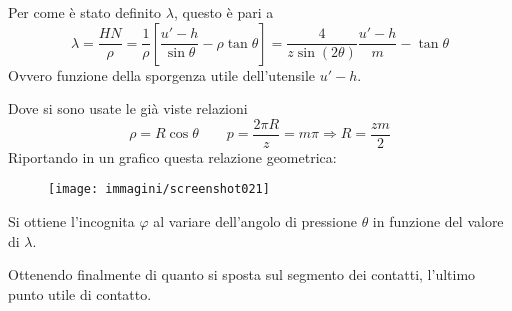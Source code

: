 \documentclass[a4paper, 15pt]{article}
\begin{document}
\begin{adjustwidth}{2in}{}
		Per come è stato definito $\lambda$, questo è pari a 
		\[\lambda = \dfrac{HN}{\rho} = \dfrac{1}{\rho}\left[\dfrac{u'-h}{\sin\theta} - \rho\tan\theta\right] = \dfrac{4}{z\sin(2\theta)} \dfrac{u'-h}{m} - \tan\theta\] 
		Ovvero funzione della sporgenza utile dell'utensile $u'- h$. 
		
		Dove si sono usate le già viste relazioni
		\[\rho = R\cos\theta \qquad p = \dfrac{2\pi R}{z} = m\pi \Rightarrow R = \dfrac{zm}{2}\] 		
		Riportando in un grafico questa relazione geometrica:
		\begin{figure}[H]
			\centering
			\texttt{[image: immagini/screenshot021]}
			\label{fig:screenshot021}
		\end{figure}
		Si ottiene l'incognita $\varphi$ al variare dell'angolo di pressione $\theta$ in funzione del valore di $\lambda$. 
		
		Ottenendo finalmente di quanto si sposta sul segmento dei contatti, l'ultimo punto utile di contatto.
\end{adjustwidth}
\newpage	
\end{document}
